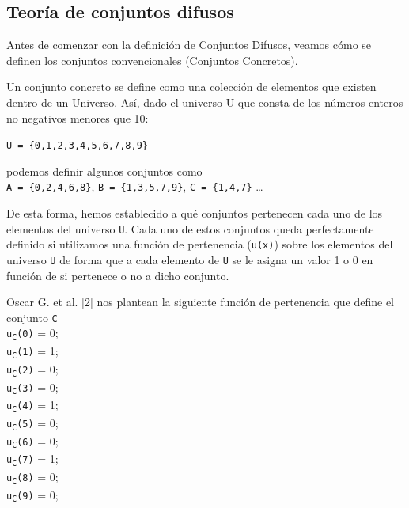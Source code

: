 \subsection{Teoría de conjuntos difusos}
Antes de comenzar con la definición de Conjuntos Difusos, veamos cómo se definen los conjuntos convencionales (Conjuntos Concretos).

Un conjunto concreto se define como una colección de elementos que
existen dentro de un Universo. Así, dado el universo U que consta de los números enteros no negativos menores que 10:

\texttt{U = \{0,1,2,3,4,5,6,7,8,9\}}

podemos definir algunos conjuntos como\\
\newline
\null\hspace{0.59cm}\texttt{A = \{0,2,4,6,8\}},\newline
\null\hspace{0.37cm}\texttt{B = \{1,3,5,7,9\}},\newline
\null\hspace{0.37cm}\texttt{C = \{1,4,7\}} \ldots

De esta forma, hemos establecido a qué conjuntos pertenecen cada uno de los elementos del universo \texttt{U}. Cada uno de estos conjuntos queda perfectamente definido si utilizamos una función de pertenencia (\texttt{u(x)}) sobre los elementos del universo \texttt{U} de forma que a cada elemento de \texttt{U} se le asigna un valor 1 o 0 en función de si pertenece o no a dicho conjunto.

Oscar G. et al. [2] nos plantean la siguiente función de pertenencia que define el conjunto \texttt{C}
\\ \newline
\null\hspace{0.59cm}\texttt{u\textsubscript{C}(0)} = 0;\\
\null\hspace{0.59cm}\texttt{u\textsubscript{C}(1)} = 1;\\
\null\hspace{0.59cm}\texttt{u\textsubscript{C}(2)} = 0;\\
\null\hspace{0.59cm}\texttt{u\textsubscript{C}(3)} = 0;\\
\null\hspace{0.59cm}\texttt{u\textsubscript{C}(4)} = 1;\\
\null\hspace{0.59cm}\texttt{u\textsubscript{C}(5)} = 0;\\
\null\hspace{0.59cm}\texttt{u\textsubscript{C}(6)} = 0;\\
\null\hspace{0.59cm}\texttt{u\textsubscript{C}(7)} = 1;\\
\null\hspace{0.59cm}\texttt{u\textsubscript{C}(8)} = 0;\\
\null\hspace{0.59cm}\texttt{u\textsubscript{C}(9)} = 0;

